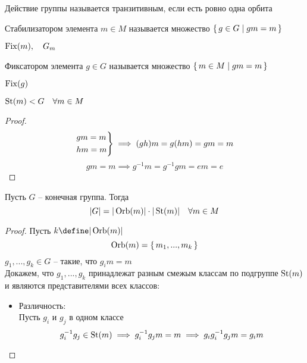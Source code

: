 \begin{definition}
	Действие группы называется транзитивным, если есть ровно одна орбита
\end{definition}

\begin{definition}
    Стабилизатором элемента $ m \in M $ называется множество $ \set{g \in G | gm = m} $
\end{definition}

\begin{notation}
    $ \operatorname{Fix}(m), \quad G_m $
\end{notation}

\begin{definition}
    Фиксатором элемента $ g \in G $ называется множество $ \set{m \in M | gm = m} $
\end{definition}

\begin{notation}
    $ \operatorname{Fix}(g) $
\end{notation}

\begin{props}
    \item $ \operatorname{St}(m) < G \quad \forall m \in M $
    \begin{proof}
    	$$
        \begin{rcases}
        	gm = m \\
            hm = m
        \end{rcases} \implies (gh)m = g(hm) = gm = m $$
        $$ gm = m \implies g^{-1}m = g^{-1}gm = em = e $$
    \end{proof}
    \item Пусть $ G $ -- конечная группа. Тогда
    $$ |G| = |\operatorname{Orb}(m)| \cdot |\operatorname{St}(m)| \quad \forall m \in M $$
    \begin{proof}
    	Пусть $ k \define |\Orb(m)| $
        $$ \operatorname{Orb}(m) = \set{m_1, ..., m_k} $$
        $ g_1, ..., g_k \in G $ -- такие, что $ g_im = m $ \\
        Докажем, что $ g_1, ..., g_k $ принадлежат разным смежым классам по подгруппе $ \operatorname{St}(m) $ и являются представителями всех классов: \\
        \begin{itemize}
        	\item Различность: \\
            Пусть $ g_i $ и $ g_j $ в одном классе
            $$ g_i^{-1}g_j \in \operatorname{St}(m) \implies g_i^{-1}g_jm = m \implies g_ig_i^{-1}g_jm = g_im $$
        \end{itemize}

    \end{proof}
\end{props}
